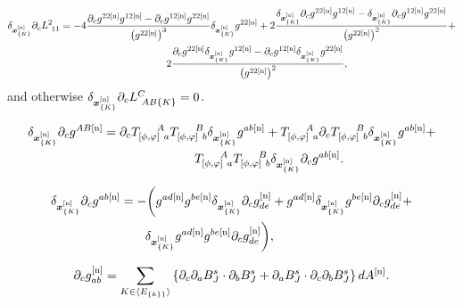 \begin{gather}  \label{B.35}
	\delta_{\bm{x}_{\{K\}}^{[\textup{n}]}} \partial_c  L_{~11}^2 =  -4\frac{\partial_c g^{22[\textup{n}]} g^{12[\textup{n}]} - \partial_cg^{12[\textup{n}]}g^{22[\textup{n}]}}{\left(g^{22[\textup{n}]}\right)^3} \delta_{\bm{x}_{\{K\}}^{[\textup{n}]}} g^{22[\textup{n}]} +   2\frac{\delta_{\bm{x}_{\{K\}}^{[\textup{n}]}} \partial_c g^{22[\textup{n}]} g^{12[\textup{n}]} - \delta_{\bm{x}_{\{K\}}^{[\textup{n}]}}  \partial_cg^{12[\textup{n}]}g^{22[\textup{n}]}}{\left(g^{22[\textup{n}]}\right)^2} + \nonumber \\ \qquad \qquad \quad
	2\frac{ \partial_c g^{22[\textup{n}]}\delta_{\bm{x}_{\{K\}}^{[\textup{n}]}} g^{12[\textup{n}]} - \partial_cg^{12[\textup{n}]}\delta_{\bm{x}_{\{K\}}^{[\textup{n}]}}g^{22[\textup{n}]}}{\left(g^{22[\textup{n}]}\right)^2},
\end{gather}
and otherwise $  \delta_{\bm{x}_{\{K\}}^{[\textup{n}]}} \partial_c  L_{~AB\{K\}}^C = 0$.

\begin{gather} \label{B.36}
	\delta_{\bm{x}_{\{K\}}^{[\textup{n}]}} \partial_cg^{AB[\textup{n}]} = \partial_cT_{[\phi,\varphi]~a}^{~~~~A} T_{[\phi,\varphi]~b}^{~~~~B}\delta_{\bm{x}_{\{K\}}^{[\textup{n}]}}g^{ab[\textup{n}]} + T_{[\phi,\varphi]~a}^{~~~~A} \partial_cT_{[\phi,\varphi]~b}^{~~~~B}\delta_{\bm{x}_{\{K\}}^{[\textup{n}]}}g^{ab[\textup{n}]} +  \\ \qquad \qquad \qquad T_{[\phi,\varphi]~a}^{~~~~A} T_{[\phi,\varphi]~b}^{~~~~B} \delta_{\bm{x}_{\{K\}}^{[\textup{n}]}} \partial_cg^{ab[\textup{n}]}.  \nonumber
\end{gather}


\begin{align}  \label{B.37}
	\delta_{\bm{x}_{\{K\}}^{[\textup{n}]}}  \partial_cg^{ab[\textup{n}]} & = -\bigg(g^{ad[\textup{n}]}g^{be[\textup{n}]}  \delta_{\bm{x}_{\{K\}}^{[\textup{n}]}} \partial_c g_{de}^{[\textup{n}]}+ g^{ad[\textup{n}]} \delta_{\bm{x}_{\{K\}}^{[\textup{n}]}} g^{be[\textup{n}]} \partial_c g_{de}^{[\textup{n}]} +  \\ & \qquad \delta_{\bm{x}_{\{K\}}^{[\textup{n}]}} g^{ad[\textup{n}]}g^{be[\textup{n}]} \partial_c g_{de}^{[\textup{n}]}\bigg), \nonumber
\end{align}

\begin{equation}  \label{B.38}
	\partial_cg_{ab}^{[\textup{n}]} =   \sum_{K\in\langle E_{\{k\} \}}\rangle} \left\{ \partial_c\partial_aB_{J}^s\cdot \partial_bB_{J}^s+ \partial_aB_{J}^s \cdot \partial_c\partial_bB_{J}^s \right\} d A^{[\text{n}]} .
\end{equation}

